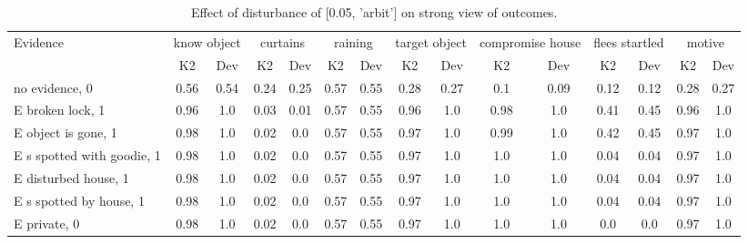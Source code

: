 \begin{table}\begin{tabular}{l|cc|cc|cc|cc|cc|cc|cc}\toprule\multirow{2}{*}{Evidence} & \multicolumn{2}{c}{know object}& \multicolumn{2}{c}{curtains}& \multicolumn{2}{c}{raining}& \multicolumn{2}{c}{target object}& \multicolumn{2}{c}{compromise house}& \multicolumn{2}{c}{flees startled}& \multicolumn{2}{c}{motive}\\& {K2} & {Dev}& {K2} & {Dev}& {K2} & {Dev}& {K2} & {Dev}& {K2} & {Dev}& {K2} & {Dev}& {K2} & {Dev}\\\midrule
no evidence, 0 & 0.56&0.54&0.24&0.25&0.57&0.55&0.28&0.27&0.1&0.09&0.12&0.12&0.28&0.27\\E broken lock, 1 & 0.96&1.0&0.03&0.01&0.57&0.55&0.96&1.0&0.98&1.0&0.41&0.45&0.96&1.0\\E object is gone, 1 & 0.98&1.0&0.02&0.0&0.57&0.55&0.97&1.0&0.99&1.0&0.42&0.45&0.97&1.0\\E s spotted with goodie, 1 & 0.98&1.0&0.02&0.0&0.57&0.55&0.97&1.0&1.0&1.0&0.04&0.04&0.97&1.0\\E disturbed house, 1 & 0.98&1.0&0.02&0.0&0.57&0.55&0.97&1.0&1.0&1.0&0.04&0.04&0.97&1.0\\E s spotted by house, 1 & 0.98&1.0&0.02&0.0&0.57&0.55&0.97&1.0&1.0&1.0&0.04&0.04&0.97&1.0\\E private, 0 & 0.98&1.0&0.02&0.0&0.57&0.55&0.97&1.0&1.0&1.0&0.0&0.0&0.97&1.0\\\bottomrule\end{tabular}\caption{Effect of disturbance of [0.05, 'arbit'] on strong view of outcomes.}\end{table}